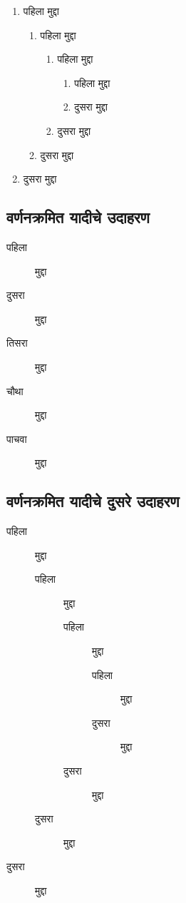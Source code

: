 \begin{enumerate}
\item पहिला मुद्दा
  \begin{enumerate}
  \item पहिला मुद्दा
    \begin{enumerate}
    \item पहिला मुद्दा
      \begin{enumerate}
      \item पहिला मुद्दा
      \item दुसरा मुद्दा
      \end{enumerate}
    \item दुसरा मुद्दा
    \end{enumerate}
  \item दुसरा मुद्दा
  \end{enumerate}
\item दुसरा मुद्दा
\end{enumerate}

\subsection{वर्णनक्रमित यादीचे उदाहरण}

\begin{description}
\item[पहिला] मुद्दा
\item[दुसरा] मुद्दा
\item[तिसरा] मुद्दा
\item[चौथा] मुद्दा
\item[पाचवा] मुद्दा
\end{description}

\subsection*{वर्णनक्रमित यादीचे दुसरे उदाहरण}

\begin{description}
\item[पहिला] मुद्दा
  \begin{description}
  \item[पहिला] मुद्दा
    \begin{description}
    \item[पहिला] मुद्दा
      \begin{description}
      \item[पहिला] मुद्दा
      \item[दुसरा] मुद्दा
      \end{description}
    \item[दुसरा] मुद्दा
    \end{description}
  \item[दुसरा] मुद्दा
  \end{description}
\item[दुसरा] मुद्दा
\end{description}
